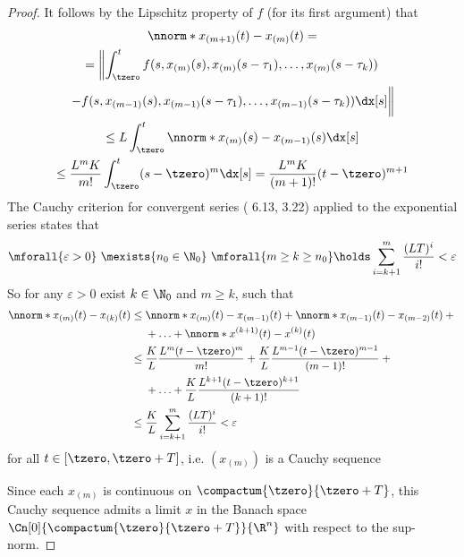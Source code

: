 \begin{proof}
        It follows by the Lipschitz property of $f$ (for its first argument) that
        \begin{multline*}
            \nnorm*{x_{(m+1)}(t)-x_{(m)}(t)}=\\
            = \left\lVert\int_\tzero^t f(s,x_{(m)}(s),x_{(m)}(s-\tau_1),\ldots,x_{(m)}(s-\tau_k))\right.\\ \left.- f(s,x_{(m-1)}(s),x_{(m-1)}(s-\tau_1),\ldots,x_{(m-1)}(s-\tau_k))\dx[s]
            \vphantom{\int_\tzero^t}\right\rVert\\
            \leq L \int_\tzero^t \nnorm*{x_{(m)}(s) - x_{(m-1)}(s)}\dx[s]\\
            \leq \frac{L^m K}{m!} \int_\tzero^t (s-\tzero)^m\dx[s]
            = \frac{L^m K}{(m+1)!}(t-\tzero)^{m+1}
        \end{multline*}
        The Cauchy criterion for convergent series (\cite{Gathmann12GDM} 6.13, \cite{Rudin76PrinciplesAnalysis} 3.22) applied to the exponential series states that
        \begin{equation*}
            \mforall{\varepsilon>0}\ \mexists{n_0\in\N_0}\ \mforall{m\geq k\geq n_0}\holds \sum_{i=k+1}^m \frac{(LT)^i}{i!} <\varepsilon
        \end{equation*}
        So for any $\varepsilon>0$ exist $k\in\N_0$ and $m\geq k$, such that
        \begin{align*}
            \nnorm*{x_{(m)}(t)-x_{(k)}(t)} \leq{} & \nnorm*{x_{(m)}(t)-x_{(m-1)}(t)} + \nnorm*{x_{(m-1)}(t)-x_{(m-2)}(t)} + {}\\
            & + \ldots + \nnorm*{x^{(k+1)}(t)-x^{(k)}(t)}\\
            \leq{} & \frac{K}{L}\frac{L^m (t-\tzero)^m}{m!} + \frac{K}{L}\frac{L^{m-1} (t-\tzero)^{m-1}}{(m-1)!} + {}\\
            & + \ldots +\frac{K}{L}\frac{L^{k+1} (t-\tzero)^{k+1}}{(k+1)!}\\
            \leq{} & \frac{K}{L}\sum_{i=k+1}^m \frac{(LT)^i}{i!} < \varepsilon
        \end{align*}
        for all $t\in [\tzero,\tzero+T]$, i.e. $(x_{(m)})$ is a Cauchy sequence

    

        Since each $x_{(m)}$ is continuous on $\compactum{\tzero}{\tzero+T}$, this Cauchy sequence admits a limit $x$ in the Banach space $\Cn[0]{\compactum{\tzero}{\tzero+T}}{\R^n}$ with respect to the sup-norm.


\end{proof}
